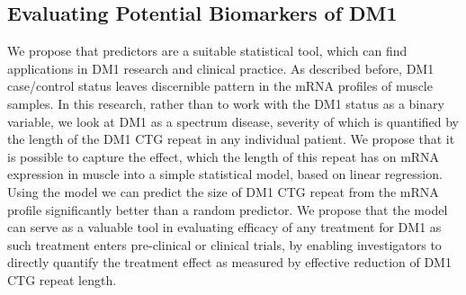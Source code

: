 \documentclass[10pt,letterpaper]{article}
\begin{document}
\subsection*{Evaluating Potential Biomarkers of DM1}

We propose that predictors are a suitable statistical tool, which can find applications in DM1 research and clinical practice. As described before, DM1 case/control status \cite{Nakamori2013, Batra2014} leaves discernible pattern in the mRNA profiles of muscle samples. In this research, rather than to work with the DM1 status as a binary variable, we look at DM1 as a spectrum disease, severity of which is quantified by the length of the DM1 CTG repeat in any individual patient. We propose that it is possible to capture the effect, which the length of this repeat has on mRNA expression in muscle into a simple statistical model, based on linear regression. Using the model we can predict the size of DM1 CTG repeat from the mRNA profile significantly better than a random predictor. We propose that the model can serve as a valuable tool in evaluating efficacy of any treatment for DM1 as such treatment enters pre-clinical or clinical trials, by enabling investigators to directly quantify the treatment effect as measured by effective reduction of DM1 CTG repeat length.

\end{document}
